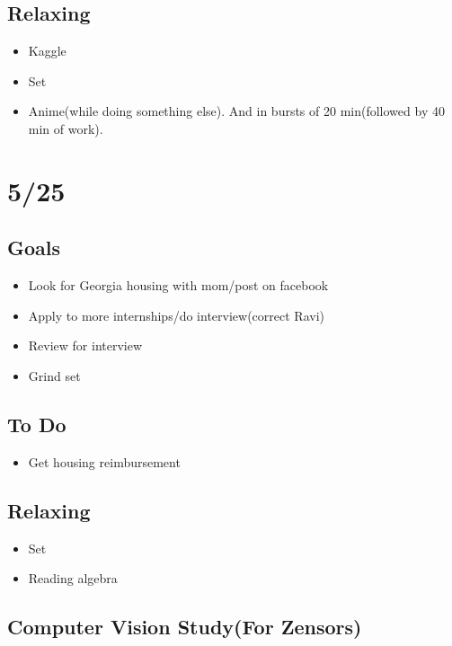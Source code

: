 \documentclass[11pt]{article}
\theoremstyle{remark}
\begin{document}
\subsection{Relaxing}

\begin{itemize}
	\item Kaggle
	\item Set
	\item Anime(while doing something else). And in bursts of 20 min(followed by 40 min of work).
\end{itemize}



\section{5/25}

\subsection{Goals}

\begin{itemize}
	\item Look for Georgia housing with mom/post on facebook
	\item Apply to more internships/do interview(correct Ravi)
	\item Review for interview
	\item Grind set
\end{itemize}

\subsection{To Do}

\begin{itemize}
	\item Get housing reimbursement
\end{itemize}

\subsection{Relaxing}

\begin{itemize}
	\item Set
	\item Reading algebra
\end{itemize}

\subsection{Computer Vision Study(For Zensors)}
\end{document}
